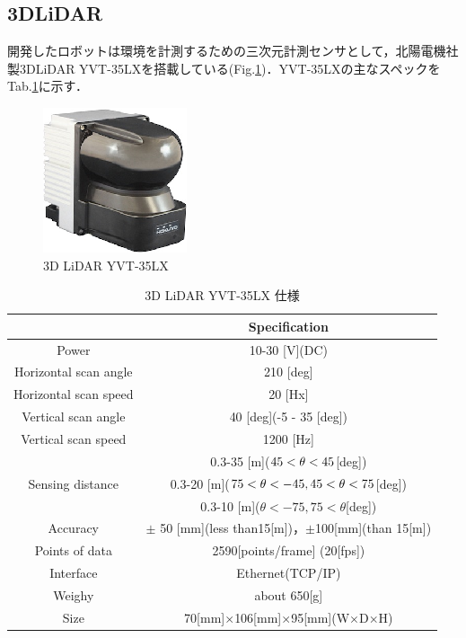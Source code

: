 \subsection{3DLiDAR} \label{LiDAR}
\par 開発したロボットは環境を計測するための三次元計測センサとして，北陽電機社製3DLiDAR YVT-35LXを搭載している(Fig.\ref{yvt-35lx})．YVT-35LXの主なスペックをTab.\ref{yvt_spec}に示す．


\begin{figure}[hb]
	\centering
	\includegraphics[clip,scale=2.5]{./figure/yvt-35lx.eps}
	\caption{3D LiDAR YVT-35LX}
	\label{yvt-35lx}
\end{figure}

\begin{table}[hb]
	\centering
	\caption{3D LiDAR YVT-35LX 仕様}
	\begin{tabular}{|c|c|} \hline
	& Specification \\ \hline
	Power 				& 10-30 [V](DC) \\ \hline
	Horizontal scan angle	& 210 [deg] \\ \hline
	Horizontal scan speed	& 20 [Hx]	\\ \hline
	Vertical scan angle		& 40 [deg](-5 - 35 [deg]) \\ \hline
	Vertical scan speed		& 1200 [Hz]	\\ \hline
						& 0.3-35 [m]($\-45<\theta < 45 $[deg]) \\
	Sensing distance	& 0.3-20 [m]($\-75 < \theta < -45,45<\theta<75$[deg]) \\
 						& 0.3-10 [m]($\theta< -75,75< \theta$[deg]) \\ \hline
	Accuracy			& $\pm$ 50 [mm](less than15[m])，$\pm$100[mm](than 15[m])\\ \hline
	Points of data		& 2590[points/frame] (20[fps])	\\ \hline
	Interface			& Ethernet(TCP/IP)				\\ \hline
	Weighy				& about 650[g]	\\ \hline
	Size				& 70[mm]$\times$106[mm]$\times$95[mm](W$\times$D$\times$H)\\ \hline
	\end{tabular}
	\label{yvt_spec}
\end{table}
